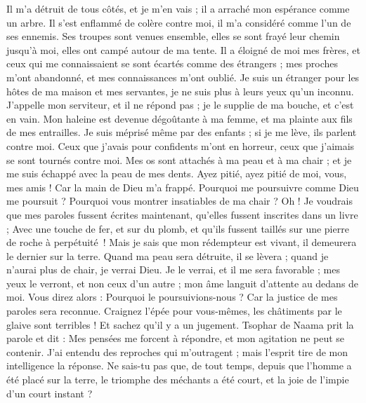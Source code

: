 \begin{multicols}{2}
Il m'a détruit de tous côtés, et je m'en vais ; il a arraché mon espérance comme un arbre.
Il s'est enflammé de colère contre moi, il m'a considéré comme l'un de ses ennemis.
Ses troupes sont venues ensemble, elles se sont frayé leur chemin jusqu'à moi, elles ont campé autour de ma tente.
Il a éloigné de moi mes frères, et ceux qui me connaissaient se sont écartés comme des étrangers ;
mes proches m'ont abandonné, et mes connaissances m'ont oublié.
Je suis un étranger pour les hôtes de ma maison et mes servantes, je ne suis plus à leurs yeux qu'un inconnu.
J'appelle mon serviteur, et il ne répond pas ; je le supplie de ma bouche, et c'est en vain.
Mon haleine est devenue dégoûtante à ma femme, et ma plainte aux fils de mes entrailles.
Je suis méprisé même par des enfants ; si je me lève, ils parlent contre moi.
Ceux que j'avais pour confidents m'ont en horreur, ceux que j'aimais se sont tournés contre moi.
Mes os sont attachés à ma peau et à ma chair ; et je me suis échappé avec la peau de mes dents.
Ayez pitié, ayez pitié de moi, vous, mes amis ! Car la main de Dieu m'a frappé.
Pourquoi me poursuivre comme Dieu me poursuit ? Pourquoi vous montrer insatiables de ma chair ?
Oh ! Je voudrais que mes paroles fussent écrites maintenant, qu'elles fussent inscrites dans un livre ;
Avec une touche de fer, et sur du plomb, et qu’ils fussent taillés sur une pierre de roche à perpétuité !
Mais je sais que mon rédempteur est vivant, il demeurera le dernier sur la terre.
Quand ma peau sera détruite, il se lèvera ; quand je n'aurai plus de chair, je verrai Dieu.
Je le verrai, et il me sera favorable ; mes yeux le verront, et non ceux d'un autre ; mon âme languit d'attente au dedans de moi.
Vous direz alors : Pourquoi le poursuivions-nous ? Car la justice de mes paroles sera reconnue.
Craignez l'épée pour vous-mêmes, les châtiments par le glaive sont terribles ! Et sachez qu'il y a un jugement.
\VerseOne{}Tsophar de Naama prit la parole et dit :
Mes pensées me forcent à répondre, et mon agitation ne peut se contenir.
J'ai entendu des reproches qui m'outragent ; mais l'esprit tire de mon intelligence la réponse.
Ne sais-tu pas que, de tout temps, depuis que l'homme a été placé sur la terre,
le triomphe des méchants a été court, et la joie de l'impie d'un court instant ?

\end{multicols}
